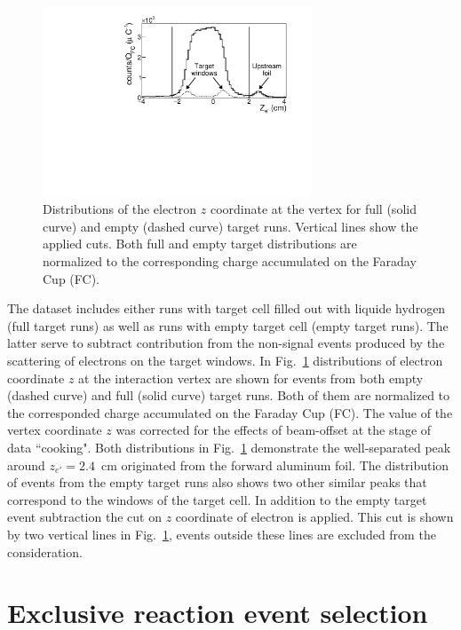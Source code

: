 \documentclass[prc,twocolumn,superscriptaddress,showpacs,amssymb,amsmath,amsfonts,linenumbers,aps]{revtex4-1}
\begin{document}
\begin{figure}[htp]
\begin{center}
 \includegraphics[width=8cm,keepaspectratio]{pictures/vertex/vertex_new.pdf}
\vspace{-0.1cm}
\caption{Distributions of the electron $z$ coordinate at the vertex for full (solid curve) and empty (dashed curve) target runs. Vertical lines show the applied cuts. Both full and empty target distributions are normalized to the corresponding charge accumulated on the Faraday Cup (FC).}
\label{fig:zvertex}
\end{center}
\end{figure} 

The dataset includes either runs with target cell filled out with liquide hydrogen (full target runs) as well as runs with empty target cell (empty target runs). The latter serve to subtract contribution from the non-signal events produced  by the scattering of electrons on the target windows. 
In Fig.~\ref{fig:zvertex} distributions of electron coordinate $z$ at the interaction vertex are shown for events from both empty (dashed curve) and full (solid curve) target runs. Both of them are normalized to the corresponded charge accumulated on the Faraday Cup (FC). The value of the vertex coordinate $z$ was corrected for the effects of beam-offset at the stage of data ``cooking". Both distributions in Fig.~\ref{fig:zvertex} demonstrate the well-separated peak around $z_{e'} = 2.4$~cm originated from the forward aluminum foil. The distribution of events from the empty target runs also shows two other similar peaks that correspond to the windows of the target cell. In addition to the empty target event subtraction the cut on $z$ coordinate of electron is applied. This cut is shown by two vertical lines in Fig.~\ref{fig:zvertex}, events outside these lines are excluded from the consideration. 
 
\section{Exclusive reaction event selection}
\label{expt}
\end{document}
